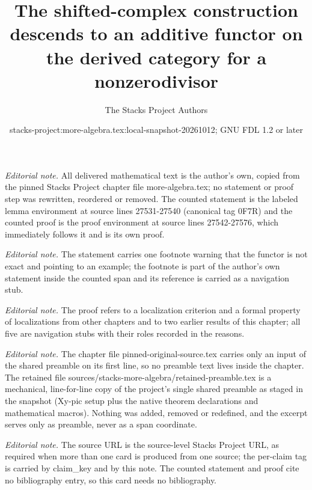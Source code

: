 \documentclass[10pt,a4paper]{amsart}
\title{The shifted-complex construction descends to an additive functor on the derived category for a nonzerodivisor}
\author{The Stacks Project Authors}
\date{stacks-project:more-algebra.tex:local-snapshot-20261012; GNU FDL 1.2 or later}
\theoremstyle{plain}
\theoremstyle{definition}
\theoremstyle{remark}
\numberwithin{equation}{subsection}
\begin{document}
\maketitle
\setcounter{subsection}{1}
\noindent\textit{Editorial note.} All delivered mathematical text is the author's own, copied from the pinned Stacks Project chapter file more-algebra.tex; no statement or proof step was rewritten, reordered or removed. The counted statement is the labeled lemma environment at source lines 27531-27540 (canonical tag 0F7R) and the counted proof is the proof environment at source lines 27542-27576, which immediately follows it and is its own proof.\par\medskip
\noindent\textit{Editorial note.} The statement carries one footnote warning that the functor is not exact and pointing to an example; the footnote is part of the author's own statement inside the counted span and its reference is carried as a navigation stub.\par\medskip
\noindent\textit{Editorial note.} The proof refers to a localization criterion and a formal property of localizations from other chapters and to two earlier results of this chapter; all five are navigation stubs with their roles recorded in the reasons.\par\medskip
\noindent\textit{Editorial note.} The chapter file pinned-original-source.tex carries only an input of the shared preamble on its first line, so no preamble text lives inside the chapter. The retained file sources/stacks-more-algebra/retained-preamble.tex is a mechanical, line-for-line copy of the project's single shared preamble as staged in the snapshot (Xy-pic setup plus the native theorem declarations and mathematical macros). Nothing was added, removed or redefined, and the excerpt serves only as preamble, never as a span coordinate.\par\medskip
\noindent\textit{Editorial note.} The source URL is the source-level Stacks Project URL, as required when more than one card is produced from one source; the per-claim tag is carried by claim\_key and by this note. The counted statement and proof cite no bibliography entry, so this card needs no bibliography.\par\medskip
\end{document}
